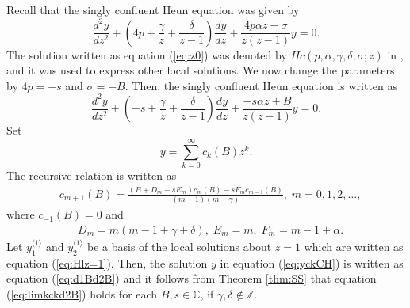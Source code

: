 \documentclass[12pt]{amsart}
\newcommand{\Zint}{\mathbb {Z}}
\newcommand{\Cplx}{\mathbb {C}}     %
\numberwithin{equation}{section}
\theoremstyle{definition}
\theoremstyle{remark}
\begin{document}
Recall that the singly confluent Heun equation was given by
\begin{equation}
\frac{d^2y}{dz^2} + \left( 4p+ \frac{\gamma}{z}+\frac{\delta }{z-1} \right) \frac{dy}{dz} +\frac{4 p \alpha z - \sigma }{z(z-1)} y=0.
\label{eq:singconfHeun}
\end{equation}
The solution written as equation (\ref{eq:z0}) was denoted by $Hc(p, \alpha,\gamma ,\delta ,\sigma  ;z)$ in \cite{Ron}, and it was used to express other local solutions.
We now change the parameters by $4p= -s $ and $\sigma = -B$.
Then, the singly confluent Heun equation is written as
\begin{equation}
\frac{d^2y}{dz^2} + \left( -s + \frac{\gamma}{z}+\frac{\delta }{z-1} \right) \frac{dy}{dz} +\frac{-s \alpha z + B }{z(z-1)} y=0 .
\end{equation}
Set 
\begin{equation}
 y = \sum _{k=0}^{\infty } c_k (B)  z^k .
\label{eq:yckCH}
\end{equation}
The recursive relation is written as
\begin{align}
& c_{m+1} (B) = \frac{(B+D_m +s E_m) c_{m} (B) -s F_m c_{m-1} (B)}{(m+1)(m+\gamma )}  , \; m=0,1,2, \dots ,
\label{eq:cm+1CH}
\end{align}
where $ c_{-1} (B)=0$ and
\begin{align}
& D_{m}= m(m-1+\gamma+\delta),\; E_{m}= m , \; F_{m}= m-1+\alpha \label{eq:CHDEF} . 
\end{align}
Let $y^{\langle 1 \rangle} _1$ and $y^{\langle 1 \rangle} _2 $ be a basis of the local solutions about $z=1$ which are written as equation (\ref{eq:Hlz=1}).
Then, the solution $y$ in equation (\ref{eq:yckCH}) is written as equation (\ref{eq:d1Bd2B}) and it follows from Theorem \ref{thm:SS} that equation (\ref{eq:limkckd2B}) holds for each $B, s  \in \Cplx $, if $\gamma , \delta \not \in \Zint $.
\end{document}
